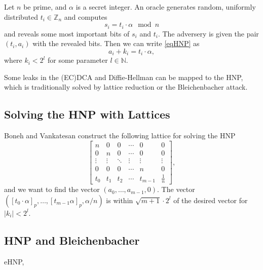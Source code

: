\begin{definition}
Let $n$ be prime, and $\alpha$ is a secret integer. An oracle generates random, uniformly distributed $t_i \in \mathbb{Z}_n$ and  computes 
\begin{equation}\label{eqHNP}
    s_i = t_i \cdot \alpha \mod n
\end{equation}
and reveals some most important bits of $s_i$ and $t_i$. The adversery is given the pair $(t_i, a_i)$ with the revealed bits. Then we can write \eqref{eqHNP} as 
\begin{equation*}
    a_i + k_i = t_i \cdot \alpha,
\end{equation*}
where $k_i < 2^l$ for some parameter $l \in \mathbb{N}$.
\end{definition}

Some leaks in the (EC)DCA and Diffie-Hellman can be mapped to the HNP, which is traditionally solved by lattice reduction or the Bleichenbacher attack.

\subsection{Solving the HNP with Lattices}
Boneh and Vankatesan construct the following lattice for solving the HNP
\begin{equation}
    \begin{bmatrix}
    n & 0 & 0 & \cdots & 0 & 0 \\
    0 & n & 0 & \cdots & 0 & 0 \\
    \vdots & \vdots & \ddots & \vdots & \vdots & \vdots \\
    0 & 0 & 0 & \cdots & n & 0 \\
    t_0 & t_1 & t_2 & \cdots & t_{m-1} & \frac{1}{n}
    \end{bmatrix},
\end{equation}
and we want to find the vector $(a_0, \ldots, a_{m-1}, 0)$. The vector $([t_0 \cdot \alpha]_p, \dots, [t_{m-1}\alpha]_p, \alpha/n)$ is within $\sqrt{m+1}\cdot 2^l$ of the desired vector for $|k_i| < 2^l$.

\subsection{HNP and Bleichenbacher}
eHNP, 